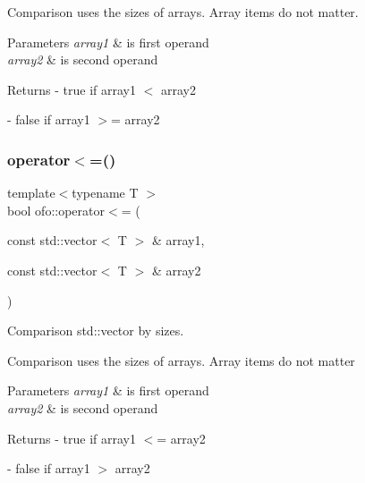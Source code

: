 Comparison uses the sizes of arrays. Array items do not matter. 
\begin{DoxyParams}{Parameters}
{\em array1} & is first operand \\
\hline
{\em array2} & is second operand \\
\hline
\end{DoxyParams}
\begin{DoxyReturn}{Returns}
-\/ true if \textquotesingle{}array1\textquotesingle{} $<$ \textquotesingle{}array2\textquotesingle{} 

-\/ false if \textquotesingle{}array1\textquotesingle{} $>$= \textquotesingle{}array2\textquotesingle{} 
\end{DoxyReturn}
\mbox{\label{namespaceofo_a248e627fce31919f3453b83efddaf1ab}} 
\subsubsection{\texorpdfstring{operator$<$=()}{operator<=()}}
{\footnotesize\ttfamily template$<$typename T $>$ \\
bool ofo\+::operator$<$= (\begin{DoxyParamCaption}\item[{const std\+::vector$<$ T $>$ \&}]{array1,  }\item[{const std\+::vector$<$ T $>$ \&}]{array2 }\end{DoxyParamCaption})}



Comparison std\+::vector by sizes. 

Comparison uses the sizes of arrays. Array items do not matter 
\begin{DoxyParams}{Parameters}
{\em array1} & is first operand \\
\hline
{\em array2} & is second operand \\
\hline
\end{DoxyParams}
\begin{DoxyReturn}{Returns}
-\/ true if \textquotesingle{}array1\textquotesingle{} $<$= \textquotesingle{}array2\textquotesingle{} 

-\/ false if \textquotesingle{}array1\textquotesingle{} $>$ \textquotesingle{}array2\textquotesingle{} 
\end{DoxyReturn}
\mbox{\label{namespaceofo_ac9b79c838072eb36ce92e234b0b4dc81}} 
